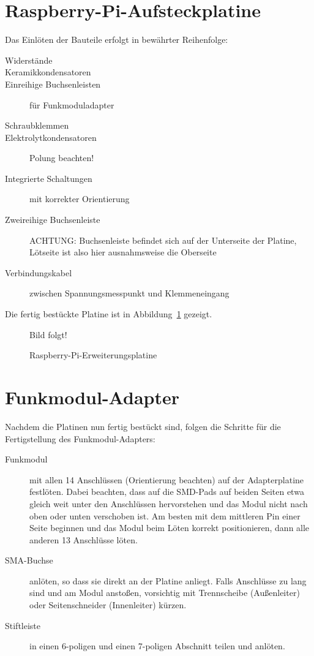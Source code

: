 \documentclass[paper=a4, parskip, numbers=noenddot, toc=listof, headsepline]{scrbook}
\begin{document}
			\section{Raspberry-Pi-Aufsteckplatine}

				Das Einlöten der Bauteile erfolgt in bewährter Reihenfolge:
				\begin{description}
					\item[Widerstände]
					\item[Keramikkondensatoren]
					\item[Einreihige Buchsenleisten] für Funkmoduladapter
					\item[Schraubklemmen]
					\item[Elektrolytkondensatoren] Polung beachten!
					\item[Integrierte Schaltungen] mit korrekter Orientierung
					\item[Zweireihige Buchsenleiste] ACHTUNG: Buchsenleiste befindet sich auf der Unterseite der Platine, Lötseite ist also hier ausnahmsweise die Oberseite
					\item[Verbindungskabel] zwischen Spannungsmesspunkt und Klemmeneingang
				\end{description}

				Die fertig bestückte Platine ist in Abbildung~\ref{fig:raspiextension} gezeigt.

				\begin{figure}
					\centering
					{\LARGE Bild folgt!}
					\caption{Raspberry-Pi-Erweiterungsplatine}
					\label{fig:raspiextension}
				\end{figure}

			\section{Funkmodul-Adapter}

				Nachdem die Platinen nun fertig bestückt sind, folgen die Schritte für die Fertigstellung des Funkmodul-Adapters:
				\begin{description}
					\item[Funkmodul] mit allen 14 Anschlüssen (Orientierung beachten) auf der Adapterplatine festlöten. Dabei beachten, dass auf die SMD-Pads auf beiden Seiten etwa gleich weit unter den Anschlüssen hervorstehen und das Modul nicht nach oben oder unten verschoben ist. Am besten mit dem mittleren Pin einer Seite beginnen und das Modul beim Löten korrekt positionieren, dann alle anderen 13 Anschlüsse löten.
					\item[SMA-Buchse] anlöten, so dass sie direkt an der Platine anliegt. Falls Anschlüsse zu lang sind und am Modul anstoßen, vorsichtig mit Trennscheibe (Außenleiter) oder Seitenschneider (Innenleiter) kürzen.
					\item[Stiftleiste] in einen 6-poligen und einen 7-poligen Abschnitt teilen und anlöten.
				\end{description}
\end{document}
